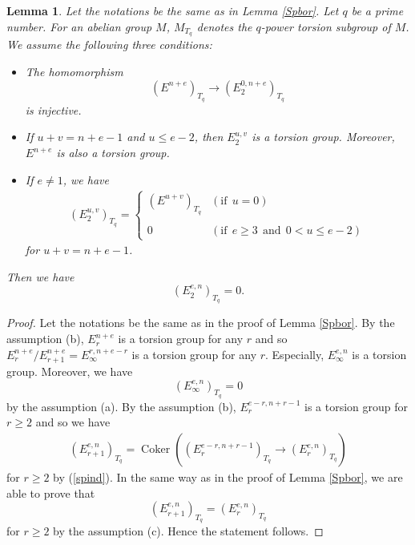 \documentclass{article}
\newtheorem{lem}[thm]{\indent \sc Lemma}
\begin{document}
%
\begin{lem}\upshape\label{borTq}
Let the notations be the same as in Lemma \ref{Spbor}. 
Let $q$ be a prime number.
For an abelian group $M$,
$M_{T_{q}}$
denotes the $q$-power torsion 
subgroup of $M$. 
We assume the following three conditions:
%
\begin{itemize}
%
\item[(a)] The homomorphism
%
\begin{equation*}
(E^{n+e})_{T_{q}}
\to
(E_{2}^{0, n+e})_{T_{q}}
\end{equation*}
%
is injective.
%
\item[(b)] If $u+v=n+e-1$ and $u\leq e-2$, then
$E_{2}^{u, v}$ is a torsion group. 
Moreover, $E^{n+e}$ is also a torsion group.
%
\item[(c)] If $e\neq 1$, we have
%
\begin{align*}
(E^{u, v}_{2})_{T_{q}}
=
%
\begin{cases}
(E^{u+v})_{T_{q}}
& (\textrm{if}~~u=0) \\
\\
0
& (\textrm{if}~~e\geq 3~~\textrm{and}~~0<u\leq e-2)
\end{cases}
%
\end{align*}
%
for $u+v=n+e-1$.
\end{itemize}
%
Then we have
%
\begin{equation*}
(E_{2}^{e, n})_{T_{q}}=0.    
\end{equation*}
%
\end{lem}
%

%
\begin{proof}\upshape
Let the notations be the same as in the proof of Lemma \ref{Spbor}. 
By the assumption (b), $E^{n+e}_{r}$ is a torsion group for any $r$ 
and
so $E^{n+e}_{r}/E^{n+e}_{r+1}=E_{\infty}^{r, n+e-r}$ is a torsion group for any $r$.
Especially,
$E_{\infty}^{e, n}$ is a torsion group.
Moreover, we have
%
\begin{equation*}
(E_{\infty}^{e, n})_{T_{q}}=0    
\end{equation*}
%
by the assumption (a).
By the assumption (b), 
$E_{r}^{e-r, n+r-1}$
is a torsion group for $r\geq 2$
and so we have
%
\begin{align*}
(E_{r+1}^{e, n})_{T_{q}}
=
\operatorname{Coker}\left(
(E_{r}^{e-r, n+r-1})_{T_{q}}
\to
(E_{r}^{e, n})_{T_{q}}
\right) 
\end{align*}
%
for $r\geq 2$ by (\ref{spind}).
In the same way as in the proof of Lemma \ref{Spbor},
we are able to prove that
%
\begin{equation*}
(E_{r+1}^{e, n})_{T_{q}}
=
(E_{r}^{e, n})_{T_{q}}
\end{equation*}
%
for $r\geq 2$ by the assumption (c). Hence the statement follows.
\end{proof}
%
\end{document}

